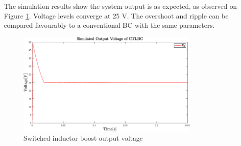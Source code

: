 The simulation results show the system output is as expected, as observed on Figure \ref {fig:Simulation_CTLBC}. Voltage levels converge at 25 V. The overshoot and ripple can be compared favourably to a conventional BC with the same parameters. 


\begin{figure} [H]
   \centering
   \includegraphics[width=0.8\textwidth]{figures/dConventionalThreeLevelBC/Simulation_CTLBC.eps}
    \caption{Switched inductor boost output voltage}
	\label{fig:Simulation_CTLBC}
\end{figure}